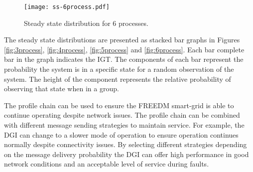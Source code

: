 \begin{figure}
    \centering
    \texttt{[image: ss-6process.pdf]}
    \caption{Steady state distribution for 6 processes.}
    \label{fig:ss-6process}
\end{figure}

The steady state distributions are presented as stacked bar graphs in Figures \ref{fig:3process}, \ref{fig:4process}, \ref{fig:5process} and \ref{fig:6process}.
Each bar complete bar in the graph indicates the IGT.
The components of each bar represent the probability the system is in a specific state for a random observation of the system.
The height of the component represents the relative probability of observing that state when in a group.

The profile chain can be used to ensure the FREEDM smart-grid is able to continue operating despite network issues.
The profile chain can be combined with different message sending strategies to maintain service.
For example, the DGI can change to a slower mode of operation to ensure operation continues normally despite connectivity issues.
By selecting different strategies depending on the message delivery probability the DGI can offer high performance in good network conditions and an acceptable level of service during faults.
